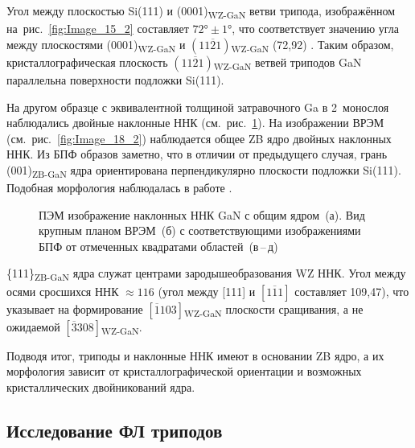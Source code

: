 Угол между плоскостью Si(111) и (0001)\textsubscript{WZ-GaN} ветви трипода,
изображённом на~рис.~\cref{fig:Image_15_2} составляет \(72\si{\degree} \pm
1\si{\degree}\), что соответствует значению угла между плоскостями
(0001)\textsubscript{WZ-GaN} и \((11\overline{2}1)\)\textsubscript{WZ-GaN}
(72,92\textdegree) \cite{Wang2016}. Таким образом, кристаллографическая
плоскость \((11\overline{2}1)\)\textsubscript{WZ-GaN} ветвей триподов GaN
параллельна поверхности подложки Si(111).

На другом образце с эквивалентной толщиной затравочного Ga в 2~монослоя
наблюдались двойные наклонные ННК (см.~рис.~\cref{fig:Image_18}). На
изображении ВРЭМ (см.~рис.~\cref{fig:Image_18_2}) наблюдается общее ZB ядро
двойных наклонных ННК. Из БПФ образов заметно, что в отличии от предыдущего
случая, грань (001)\textsubscript{ZB-GaN} ядра ориентирована перпендикулярно
плоскости подложки Si(111). Подобная морфология наблюдалась в работе
\cite{Wang2017}.

\begin{figure}[ht]  \caption{ПЭМ
				изображение наклонных ННК GaN с общим ядром~(а). Вид крупным планом
				ВРЭМ~(б) с соответствующими изображениями БПФ от отмеченных квадратами
		областей~(в\,--\,д)}\label{fig:Image_18} \end{figure}

\{111\}\textsubscript{ZB-GaN} ядра служат центрами зародышеобразования WZ ННК.
Угол между осями сросшихся ННК \(\approx 116\){\textdegree} (угол между [111] и
\([\overline{111}]\) составляет 109,47\textdegree), что указывает на
формирование \([\overline{1}103]\)\textsubscript{WZ-GaN} плоскости сращивания,
а не ожидаемой \([\overline{3}308]\)\textsubscript{WZ-GaN}.

Подводя итог, триподы и наклонные ННК имеют в основании ZB ядро, а их
морфология зависит от кристаллографической ориентации и возможных
кристаллических двойникований ядра.

\subsection{Исследование ФЛ триподов}\label{subsec:ch3/sec2/sub3}

